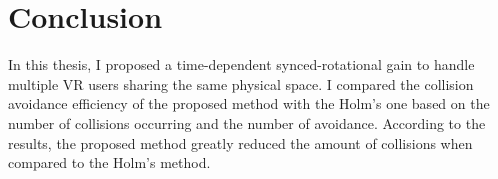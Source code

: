 \chapter{Conclusion} %

\label{Chapter6}


In this thesis, I proposed a time-dependent synced-rotational gain to handle multiple VR users sharing the same physical space. I compared the collision avoidance efficiency of the proposed method with the Holm's one based on the number of collisions occurring and the number of avoidance.
According to the results, the proposed method greatly reduced the amount of collisions when compared to the Holm's method.







